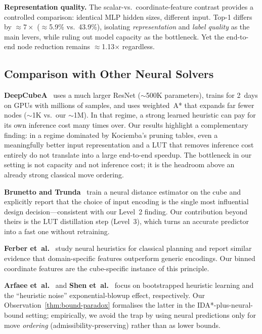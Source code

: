 \documentclass[graybox]{svmult}
\begin{document}
\textbf{Representation quality.} The scalar-vs.\ coordinate-feature contrast provides a controlled comparison: identical MLP hidden sizes, different input. Top-1 differs by $\approx$$7\times$ ($\approx$5.9\% vs.\ 43.9\%), isolating \emph{representation} and \emph{label quality} as the main levers, while ruling out model capacity as the bottleneck. Yet the end-to-end node reduction remains $\approx$1.13$\times$ regardless.

\subsection{Comparison with Other Neural Solvers}

\textbf{DeepCubeA}~\cite{deepcubea} uses a much larger ResNet ($\sim$500K parameters), trains for 2~days on GPUs with millions of samples, and uses weighted~A* that expands far fewer nodes ($\sim$1K vs.\ our $\sim$1M). In that regime, a strong learned heuristic can pay for its own inference cost many times over. Our results highlight a complementary finding: in a regime dominated by Kociemba's pruning tables, even a meaningfully better input representation and a LUT that removes inference cost entirely do not translate into a large end-to-end speedup. The bottleneck in our setting is not capacity and not inference cost; it is the headroom above an already strong classical move ordering.

\textbf{Brunetto and Trunda}~\cite{brunetto2017} train a neural distance estimator on the cube and explicitly report that the choice of input encoding is the single most influential design decision---consistent with our Level~2 finding. Our contribution beyond theirs is the LUT distillation step (Level~3), which turns an accurate predictor into a fast one without retraining.

\textbf{Ferber et~al.}~\cite{ferber2022} study neural heuristics for classical planning and report similar evidence that domain-specific features outperform generic encodings. Our binned coordinate features are the cube-specific instance of this principle.

\textbf{Arfaee et~al.}~\cite{arfaee2011} and \textbf{Shen et~al.}~\cite{shen2020} focus on bootstrapped heuristic learning and the ``heuristic noise'' exponential-blowup effect, respectively. Our Observation~\ref{thm:bound-paradox} formalises the latter in the IDA*-plus-neural-bound setting; empirically, we avoid the trap by using neural predictions only for move \emph{ordering} (admissibility-preserving) rather than as lower bounds.
\end{document}
